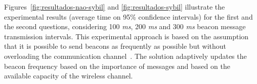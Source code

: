 \documentclass[preprint,12pt]{elsarticle}
\begin{document}
Figures~\ref{fig:resultados-nao-sybil} and \ref{fig:resultados-sybil} illustrate the experimental results (average time on 95\% confidence intervals) for the first and the second questions, considering 100 \textit{ms}, 200 \textit{ms} and 300 \textit{ms} beacon message transmission intervals. This experimental approach is based on the assumption that it is possible to send beacons as frequently as possible but without overloading the communication channel~\cite{sommer2011traffic}. The solution adaptively updates the beacon frequency based on the importance of messages and based on the available capacity of the wireless channel.


\end{document}
